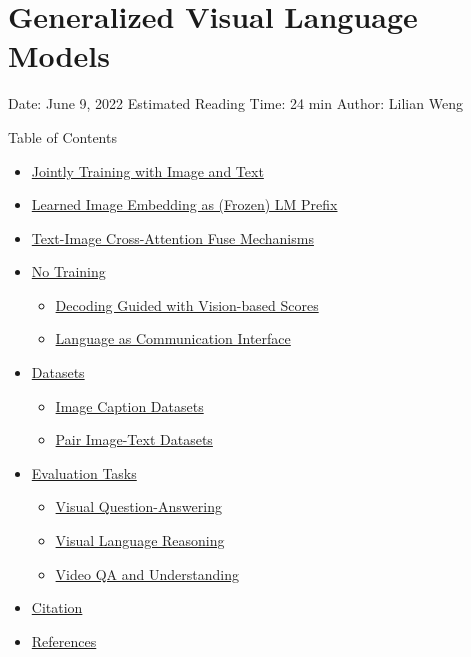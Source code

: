 \section{Generalized Visual Language Models}\label{generalized-visual-language-models}

Date: June 9, 2022 \textbar{} Estimated Reading Time: 24 min \textbar{} Author: Lilian Weng

{Table of Contents}

\begin{itemize}
\tightlist
\item
  \hyperref[jointly-training-with-image-and-text]{Jointly Training with Image and Text}
\item
  \hyperref[learned-image-embedding-as-frozen-lm-prefix]{Learned Image Embedding as (Frozen) LM Prefix}
\item
  \hyperref[text-image-cross-attention-fuse-mechanisms]{Text-Image Cross-Attention Fuse Mechanisms}
\item
  \hyperref[no-training]{No Training}

  \begin{itemize}
  \tightlist
  \item
    \hyperref[decoding-guided-with-vision-based-scores]{Decoding Guided with Vision-based Scores}
  \item
    \hyperref[language-as-communication-interface]{Language as Communication Interface}
  \end{itemize}
\item
  \hyperref[datasets]{Datasets}

  \begin{itemize}
  \tightlist
  \item
    \hyperref[image-caption-datasets]{Image Caption Datasets}
  \item
    \hyperref[pair-image-text-datasets]{Pair Image-Text Datasets}
  \end{itemize}
\item
  \hyperref[evaluation-tasks]{Evaluation Tasks}

  \begin{itemize}
  \tightlist
  \item
    \hyperref[visual-question-answering]{Visual Question-Answering}
  \item
    \hyperref[visual-language-reasoning]{Visual Language Reasoning}
  \item
    \hyperref[video-qa-and-understanding]{Video QA and Understanding}
  \end{itemize}
\item
  \hyperref[citation]{Citation}
\item
  \hyperref[references]{References}
\end{itemize}

